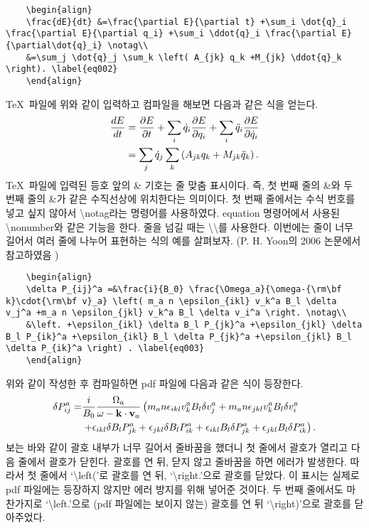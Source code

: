 \documentclass{gshs_thesis}
\begin{document}
\begin{lstlisting}
	\begin{align}
	\frac{dE}{dt} &=\frac{\partial E}{\partial t} +\sum_i \dot{q}_i \frac{\partial E}{\partial q_i} +\sum_i \ddot{q}_i \frac{\partial E}{\partial\dot{q}_i} \notag\\
	&=\sum_j \dot{q}_j \sum_k \left( A_{jk} q_k +M_{jk} \ddot{q}_k \right). \label{eq002}
	\end{align}
\end{lstlisting}
\TeX\ 파일에 위와 같이 입력하고 컴파일을 해보면 다음과 같은 식을 얻는다.
\begin{align}
\frac{dE}{dt} &=\frac{\partial E}{\partial t} +\sum_i \dot{q}_i \frac{\partial E}{\partial q_i} +\sum_i \ddot{q}_i \frac{\partial E}{\partial\dot{q}_i} \notag\\
&=\sum_j \dot{q}_j \sum_k \left( A_{jk} q_k +M_{jk} \ddot{q}_k \right). \label{eq002}
\end{align}
\TeX\ 파일에 입력된 등호 앞의 \& 기호는 줄 맞춤 표시이다. 즉, 첫 번째 줄의 \&와 두 번째 줄의 \&가 같은 수직선상에 위치한다는 의미이다. 첫 번째 줄에서는 수식 번호를 넣고 싶지 않아서 {\textbackslash}notag라는 명령어를 사용하였다. equation 명령어에서 사용된 {\textbackslash}nonumber와 같은 기능을 한다. 줄을 넘길 때는 {\textbackslash}{\textbackslash}를 사용한다. 이번에는 줄이 너무 길어서 여러 줄에 나누어 표현하는 식의 예를 살펴보자. (P. H. Yoon의 2006 논문에서 참고하였음 \cite{Yoon06})
\begin{lstlisting}
	\begin{align}
	\delta P_{ij}^a =&\frac{i}{B_0} \frac{\Omega_a}{\omega-{\rm\bf k}\cdot{\rm\bf v}_a} \left( m_a n \epsilon_{ikl} v_k^a B_l \delta v_j^a +m_a n \epsilon_{jkl} v_k^a B_l \delta v_i^a \right. \notag\\
	&\left. +\epsilon_{ikl} \delta B_l P_{jk}^a +\epsilon_{jkl} \delta B_l P_{ik}^a +\epsilon_{ikl} B_l \delta P_{jk}^a +\epsilon_{jkl} B_l \delta P_{ik}^a \right) . \label{eq003}
	\end{align}
\end{lstlisting}
위와 같이 작성한 후 컴파일하면 pdf 파일에 다음과 같은 식이 등장한다.
\begin{align}
\delta P_{ij}^a =&\frac{i}{B_0} \frac{\Omega_a}{\omega-{\rm\bf k}\cdot{\rm\bf v}_a} \left( m_a n \epsilon_{ikl} v_k^a B_l \delta v_j^a +m_a n \epsilon_{jkl} v_k^a B_l \delta v_i^a \right. \notag\\
&\left. +\epsilon_{ikl} \delta B_l P_{jk}^a +\epsilon_{jkl} \delta B_l P_{ik}^a +\epsilon_{ikl} B_l \delta P_{jk}^a +\epsilon_{jkl} B_l \delta P_{ik}^a \right) . \label{eq003}
\end{align}
보는 바와 같이 괄호 내부가 너무 길어서 줄바꿈을 했더니 첫 줄에서 괄호가 열리고 다음 줄에서 괄호가 닫힌다.  괄호를 연 뒤, 닫지 않고 줄바꿈을 하면 에러가 발생한다. 따라서 첫 줄에서 `{\textbackslash}left('로 괄호를 연 뒤, `{\textbackslash}right.'으로 괄호를 닫았다. 이 표시는 실제로 pdf 파일에는 등장하지 않지만 에러 방지를 위해 넣어준 것이다. 두 번째 줄에서도 마찬가지로 `{\textbackslash}left.'으로 (pdf 파일에는 보이지 않는) 괄호를 연 뒤 `{\textbackslash}right)'으로 괄호를 닫아주었다.
\end{document}
